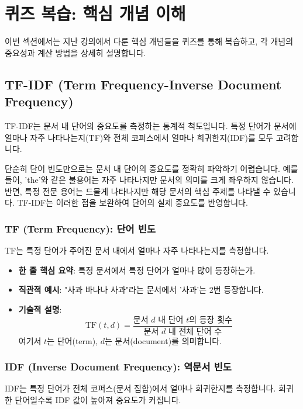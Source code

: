 \documentclass[11pt,a4paper]{article}
\begin{document}
\newpage
\section{퀴즈 복습: 핵심 개념 이해}
이번 섹션에서는 지난 강의에서 다룬 핵심 개념들을 퀴즈를 통해 복습하고, 각 개념의 중요성과 계산 방법을 상세히 설명합니다.

\subsection{TF-IDF (Term Frequency-Inverse Document Frequency)}
TF-IDF는 문서 내 단어의 중요도를 측정하는 통계적 척도입니다. 특정 단어가 문서에 얼마나 자주 나타나는지(TF)와 전체 코퍼스에서 얼마나 희귀한지(IDF)를 모두 고려합니다.

\begin{tcolorbox}[title=\textbf{TF-IDF의 필요성}]
단순히 단어 빈도만으로는 문서 내 단어의 중요도를 정확히 파악하기 어렵습니다. 예를 들어, 'the'와 같은 불용어는 자주 나타나지만 문서의 의미를 크게 좌우하지 않습니다. 반면, 특정 전문 용어는 드물게 나타나지만 해당 문서의 핵심 주제를 나타낼 수 있습니다. TF-IDF는 이러한 점을 보완하여 단어의 실제 중요도를 반영합니다.
\end{tcolorbox}

\subsubsection{TF (Term Frequency): 단어 빈도}
TF는 특정 단어가 주어진 문서 내에서 얼마나 자주 나타나는지를 측정합니다.

\begin{itemize}
    \item \textbf{한 줄 핵심 요약}: 특정 문서에서 특정 단어가 얼마나 많이 등장하는가.
    \item \textbf{직관적 예시}: "사과 바나나 사과"라는 문서에서 '사과'는 2번 등장합니다.
    \item \textbf{기술적 설명}:
        \begin{equation*}
        \text{TF}(t, d) = \frac{\text{문서 } d \text{ 내 단어 } t \text{의 등장 횟수}}{\text{문서 } d \text{ 내 전체 단어 수}}
        \end{equation*}
        여기서 $t$는 단어(term), $d$는 문서(document)를 의미합니다.
\end{itemize}

\subsubsection{IDF (Inverse Document Frequency): 역문서 빈도}
IDF는 특정 단어가 전체 코퍼스(문서 집합)에서 얼마나 희귀한지를 측정합니다. 희귀한 단어일수록 IDF 값이 높아져 중요도가 커집니다.
\end{document}
